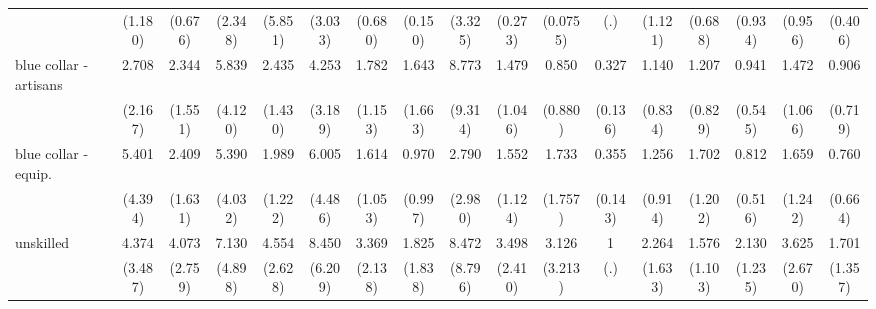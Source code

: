 {\begin{tabular}{l*{16}{c}}
                    &     (1.180)         &     (0.676)         &     (2.348)         &     (5.851)         &     (3.033)         &     (0.680)         &     (0.150)         &     (3.325)         &     (0.273)         &    (0.0755)         &         (.)         &     (1.121)         &     (0.688)         &     (0.934)         &     (0.956)         &     (0.406)         \\
[1em]
blue collar - artisans&       2.708         &       2.344         &       5.839\sym{*}  &       2.435         &       4.253         &       1.782         &       1.643         &       8.773\sym{*}  &       1.479         &       0.850         &       0.327\sym{**} &       1.140         &       1.207         &       0.941         &       1.472         &       0.906         \\
                    &     (2.167)         &     (1.551)         &     (4.120)         &     (1.430)         &     (3.189)         &     (1.153)         &     (1.663)         &     (9.314)         &     (1.046)         &     (0.880)         &     (0.136)         &     (0.834)         &     (0.829)         &     (0.545)         &     (1.066)         &     (0.719)         \\
[1em]
blue collar - equip.&       5.401\sym{*}  &       2.409         &       5.390\sym{*}  &       1.989         &       6.005\sym{*}  &       1.614         &       0.970         &       2.790         &       1.552         &       1.733         &       0.355\sym{*}  &       1.256         &       1.702         &       0.812         &       1.659         &       0.760         \\
                    &     (4.394)         &     (1.631)         &     (4.032)         &     (1.222)         &     (4.486)         &     (1.053)         &     (0.997)         &     (2.980)         &     (1.124)         &     (1.757)         &     (0.143)         &     (0.914)         &     (1.202)         &     (0.516)         &     (1.242)         &     (0.664)         \\
[1em]
unskilled           &       4.374         &       4.073\sym{*}  &       7.130\sym{**} &       4.554\sym{**} &       8.450\sym{**} &       3.369         &       1.825         &       8.472\sym{*}  &       3.498         &       3.126         &           1         &       2.264         &       1.576         &       2.130         &       3.625         &       1.701         \\
                    &     (3.487)         &     (2.759)         &     (4.898)         &     (2.628)         &     (6.209)         &     (2.138)         &     (1.838)         &     (8.796)         &     (2.410)         &     (3.213)         &         (.)         &     (1.633)         &     (1.103)         &     (1.235)         &     (2.670)         &     (1.357)         \\

\end{tabular}}
